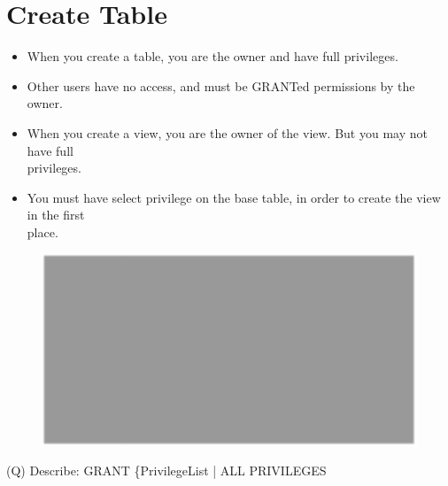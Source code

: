 \documentclass[12pt]{article}
\begin{document}
\section{Create Table}
\begin{itemize}
  \item When you create a table, you are the 
owner and have full privileges.\\
  \item Other users have no access, and must be 
GRANTed permissions by the owner.\\
  \item When you create a view, you are the owner
of the view. But you may not have full \\
privileges.\\
  \item You must have select privilege on the base 
table, in order to create the view in the first \\
place.\\
\end{itemize}
\begin{figure}[H]
\includegraphics[width=0.5\linewidth]{page20-image-2.png}
\end{figure}
\clearpage
(Q)
Describe: GRANT \{PrivilegeList | ALL PRIVILEGES\
\\ 
 \\
\end{document}

